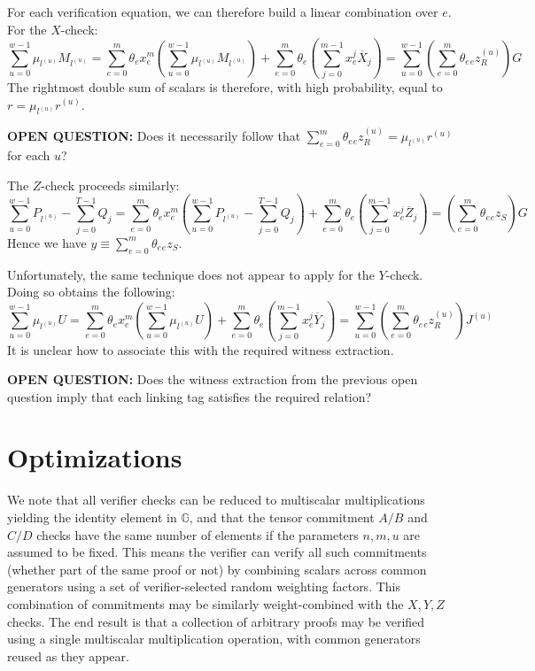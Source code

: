 \documentclass[draft]{article}
\newcommand{\G}{\mathbb{G}}
\newcommand{\sumj}{\sum_{j=0}^{m-1}}
\newcommand{\sumu}{\sum_{u=0}^{w-1}}
\begin{document}
For each verification equation, we can therefore build a linear combination over $e$. For the $X$-check:
$$\sumu \mu_{l^{(u)}} M_{l^{(u)}} = \sum_{e=0}^m \theta_ex_e^m \left( \sumu \mu_{l^{(u)}} M_{l^{(u)}} \right) + \sum_{e=0}^m \theta_e \left( \sumj x_e^j \overline{X}_j \right) = \sumu \left( \sum_{e=0}^m \theta_e {}_ez^{(u)}_R \right) G$$
The rightmost double sum of scalars is therefore, with high probability, equal to $r = \mu_{l^{(u)}} r^{(u)}$.

\textbf{OPEN QUESTION:} Does it necessarily follow that $\sum_{e=0}^m \theta_e {}_ez^{(u)}_R = \mu_{l^{(u)}} r^{(u)}$ for each $u$?

The $Z$-check proceeds similarly:
$$\sumu P_{l^{(u)}} - \sum_{j=0}^{T-1} Q_j = \sum_{e=0}^m \theta_ex_e^m \left( \sumu P_{l^{(u)}} - \sum_{j=0}^{T-1} Q_j \right) + \sum_{e=0}^m \theta_e \left( \sumj x_e^j \overline{Z}_j \right) = \left( \sum_{e=0}^m \theta_e {}_ez_S  \right)G$$
Hence we have $y \equiv \sum_{e=0}^m \theta_e {}_ez_S$.

Unfortunately, the same technique does not appear to apply for the $Y$-check. Doing so obtains the following:
$$\sumu \mu_{l^{(u)}} U = \sum_{e=0}^m \theta_ex_e^m \left( \sumu \mu_{l^{(u)}} U \right) + \sum_{e=0}^m \theta_e \left( \sumj x_e^j \overline{Y}_j \right) = \sumu \left( \sum_{e=0}^m \theta_e {}_ez^{(u)}_R \right) J^{(u)}$$
It is unclear how to associate this with the required witness extraction.

\textbf{OPEN QUESTION:} Does the witness extraction from the previous open question imply that each linking tag satisfies the required relation?


\section{Optimizations}
We note that all verifier checks can be reduced to multiscalar multiplications yielding the identity element in $\G$, and that the tensor commitment $A/B$ and $C/D$ checks have the same number of elements if the parameters $n,m,u$ are assumed to be fixed.
This means the verifier can verify all such commitments (whether part of the same proof or not) by combining scalars across common generators using a set of verifier-selected random weighting factors.
This combination of commitments may be similarly weight-combined with the $X,Y,Z$ checks.
The end result is that a collection of arbitrary proofs may be verified using a single multiscalar multiplication operation, with common generators reused as they appear.
\end{document}

